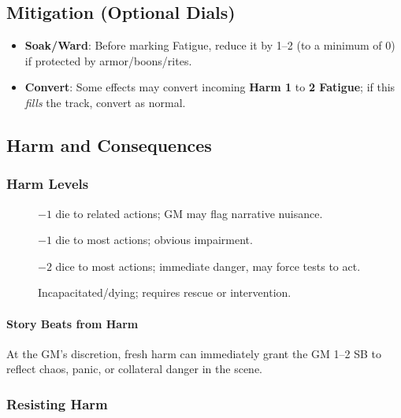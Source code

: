 \subsection*{Mitigation (Optional Dials)}
\begin{itemize}
  \item \textbf{Soak/Ward}: Before marking Fatigue, reduce it by 1--2 (to a minimum of 0) if protected by armor/boons/rites.
  \item \textbf{Convert}: Some effects may convert incoming \textbf{Harm 1} to \textbf{2 Fatigue}; if this \emph{fills} the track, convert as normal.
\end{itemize}

\subsection{Harm and Consequences}
\label{sec:harm-consequences}

\subsubsection*{Harm Levels}
\label{subsec:harm-levels}

\begin{description}
  \item[] $-1$ die to related actions; GM may flag narrative nuisance. 
  \item[] $-1$ die to most actions; obvious impairment. 
  \item[] $-2$ dice to most actions; immediate danger, may force tests to act. 
  \item[] Incapacitated/dying; requires rescue or intervention. 
\end{description}

\paragraph{Story Beats from Harm}
At the GM’s discretion, fresh harm can immediately grant the GM 1--2 SB to reflect chaos, panic, or collateral danger in the scene.

\subsubsection*{Resisting Harm}
\label{subsec:resisting-harm}

